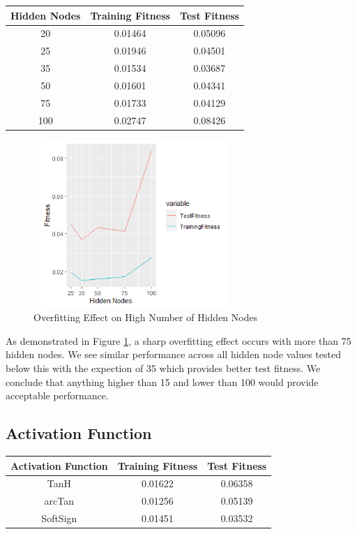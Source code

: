 \documentclass[sigconf]{acmart}
\begin{document}
\begin{center}
\begin{tabular} {|c|c|c|}
\hline
Hidden Nodes & Training Fitness & Test Fitness \\
\hline
20 & 0.01464 & 0.05096 \\
25 & 0.01946 & 0.04501 \\
35 & 0.01534 & 0.03687 \\
50 & 0.01601 & 0.04341 \\
75 & 0.01733 & 0.04129\\
100 & 0.02747 &0.08426 \\
\hline

\end{tabular}
\end{center}

\begin{figure}[!htb]
\includegraphics[height=2.5in,width=3in]{NodesGraph}
\caption{Overfitting Effect on High Number of Hidden Nodes}
\label{fig:nodesGraph}
\end{figure}
As demonstrated in Figure \ref{fig:nodesGraph}, a sharp overfitting effect occurs with more than 75 hidden nodes. We see similar performance across all hidden node values tested below this with the expection of 35 which provides better test fitness. We conclude that anything higher than 15 and lower than 100 would provide acceptable performance.
\subsection{Activation Function}

\begin{center}
\begin{tabular} {|c|c|c|}
\hline
Activation Function & Training Fitness & Test Fitness \\
\hline
TanH & 0.01622 & 0.06358 \\
arcTan & 0.01256 & 0.05139 \\
SoftSign & 0.01451 & 0.03532 \\

\hline

\end{tabular}
\end{center}
\end{document}
